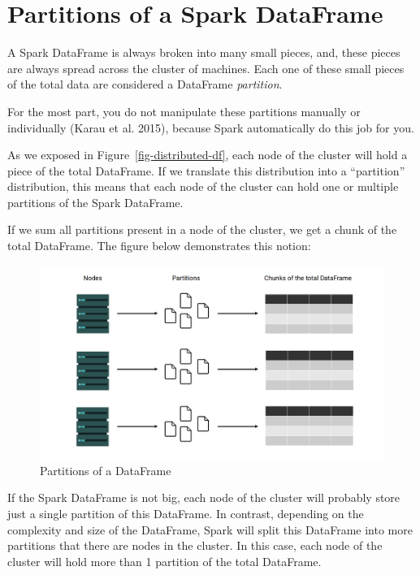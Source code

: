 \documentclass[
  11pt,
  letterpaper,
  DIV=11,
  numbers=noendperiod]{scrreprt}
\begin{document}
\hypertarget{partitions-of-a-spark-dataframe}{%
\section{Partitions of a Spark
DataFrame}\label{partitions-of-a-spark-dataframe}}

A Spark DataFrame is always broken into many small pieces, and, these
pieces are always spread across the cluster of machines. Each one of
these small pieces of the total data are considered a DataFrame
\emph{partition}.

For the most part, you do not manipulate these partitions manually or
individually (Karau et al. 2015), because Spark automatically do this
job for you.

As we exposed in Figure~\ref{fig-distributed-df}, each node of the
cluster will hold a piece of the total DataFrame. If we translate this
distribution into a ``partition'' distribution, this means that each
node of the cluster can hold one or multiple partitions of the Spark
DataFrame.

If we sum all partitions present in a node of the cluster, we get a
chunk of the total DataFrame. The figure below demonstrates this notion:

\begin{figure}

{\centering \includegraphics{Chapters/../Figures/partitions-df.png}

}

\caption{\label{fig-partitions-df}Partitions of a DataFrame}

\end{figure}

If the Spark DataFrame is not big, each node of the cluster will
probably store just a single partition of this DataFrame. In contrast,
depending on the complexity and size of the DataFrame, Spark will split
this DataFrame into more partitions that there are nodes in the cluster.
In this case, each node of the cluster will hold more than 1 partition
of the total DataFrame.
\end{document}
